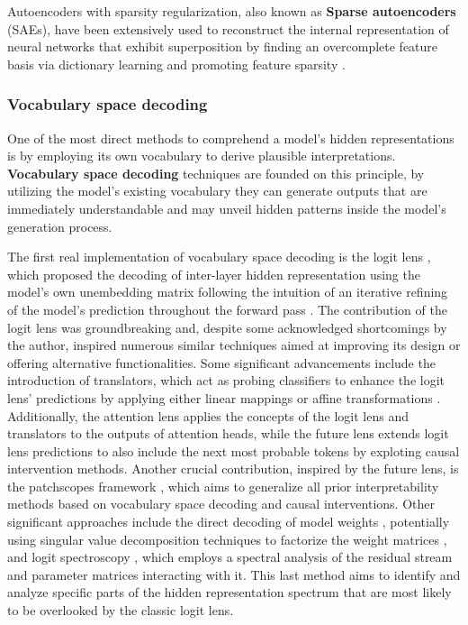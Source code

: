 
Autoencoders with sparsity regularization, also known as \textbf{Sparse autoencoders} (SAEs), have been extensively used to reconstruct the internal representation of neural networks that exhibit superposition by finding an overcomplete feature basis via dictionary learning and promoting feature sparsity \cite{bricken2023, cunningham2023}.

\subsubsection{Vocabulary space decoding}

One of the most direct methods to comprehend a model's hidden representations is by employing its own vocabulary to derive plausible interpretations. \textbf{Vocabulary space decoding} techniques are founded on this principle, by utilizing the model's existing vocabulary they can generate outputs that are immediately understandable and may unveil hidden patterns inside the model's generation process.

The first real implementation of vocabulary space decoding is the logit lens \cite{nostalgebraist2020}, which proposed the decoding of inter-layer hidden representation using the model's own unembedding matrix following the intuition of an iterative refining of the model's prediction throughout the forward pass \cite{jastrzebski2017}.
The contribution of the logit lens was groundbreaking and, despite some acknowledged shortcomings by the author, inspired numerous similar techniques aimed at improving its design or offering alternative functionalities.
Some significant advancements include the introduction of translators, which act as probing classifiers to enhance the logit lens' predictions by applying either linear mappings \cite{din2024} or affine transformations \cite{belrose2023a}.
Additionally, the attention lens \cite{sakarvadia2023} applies the concepts of the logit lens and translators to the outputs of attention heads, while the future lens \cite{pal2023} extends logit lens predictions to also include the next most probable tokens by exploting causal intervention methods.
Another crucial contribution, inspired by the future lens, is the patchscopes framework \cite{ghandeharioun2024}, which aims to generalize all prior interpretability methods based on vocabulary space decoding and causal interventions.
Other significant approaches include the direct decoding of model weights \cite{dar2023}, potentially using singular value decomposition techniques to factorize the weight matrices \cite{millidge2022}, and logit spectroscopy \cite{cancedda2024}, which employs a spectral analysis of the residual stream and parameter matrices interacting with it.
This last method aims to identify and analyze specific parts of the hidden representation spectrum that are most likely to be overlooked by the classic logit lens.

